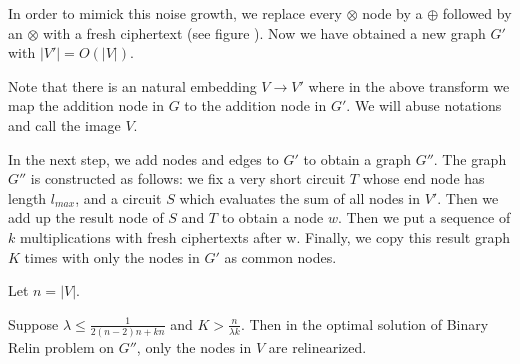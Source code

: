 \documentclass[11pt]{article} %
\theoremstyle{plain}
\theoremstyle{definition}
\begin{document}
In order to mimick this noise growth, we replace every $\otimes$ node by 
a $\oplus$ followed by an $\otimes$ with a fresh ciphertext  (see figure ). 
Now we have obtained a new graph $G'$ with $|V'| = O(|V|)$. 





Note that there is an natural embedding $V \to V'$ where in the above transform we map the addition node in $G$ to the addition node in $G'$. 
We will abuse notations and call the image $V$. 

In the next step, we add nodes and edges to $G'$ to obtain a graph $G''$. 
The graph $G''$ is constructed as follows: we fix a very short circuit $T$ whose end node has length $l_{max}$, and a circuit $S$ which evaluates 
the sum of all nodes in $V'$. Then we add up the result node of $S$ and $T$ to obtain a node $w$. Then we put a sequence of $k$ multiplications with fresh ciphertexts after w. Finally, we copy this result graph $K$ times with only the nodes in $G'$ as common nodes.  

Let $n = |V|$. 
\begin{lemma}
Suppose $\lambda  \leq \frac{1}{2(n-2)n + kn}$ and $K > \frac{n}{\lambda k}$. 
Then in the optimal solution of Binary Relin problem on $G''$, only the nodes in $V$ are relinearized. 
\end{lemma}
\end{document}
